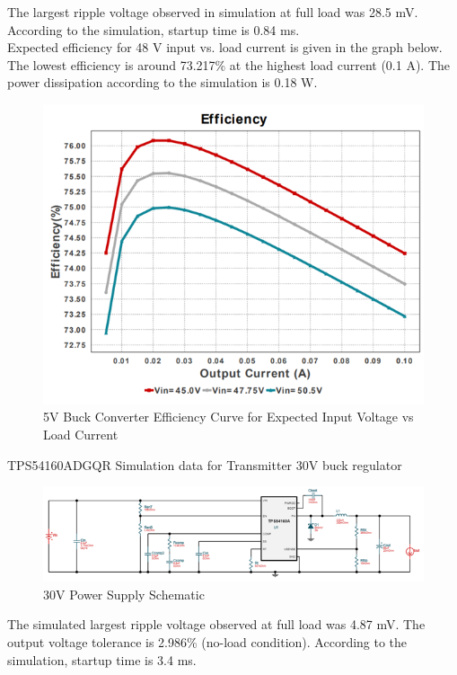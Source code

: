 \documentclass[12pt]{article}
\begin{document}
\noindent
The largest ripple voltage observed in simulation at full load was 28.5 mV.\\

\noindent
According to the simulation, startup time is 0.84 ms.\\

\noindent
Expected efficiency for 48 V input vs. load current is given in the graph below. The lowest efficiency is around 73.217\% at the highest load current (0.1 A). The power dissipation according to the simulation is 0.18 W.

\begin{figure}[h!]
\centering
\includegraphics[width=0.9\linewidth]{5V_eff}
\caption{5V Buck Converter Efficiency Curve for Expected Input Voltage vs Load Current}
\end{figure}

\noindent
TPS54160ADGQR  Simulation data for Transmitter 30V buck regulator

\begin{figure}[h!]
\centering
\includegraphics[width=0.9\linewidth]{48V_schem}
\caption{30V Power Supply Schematic}
\end{figure}

\noindent
The simulated largest ripple voltage observed at full load was 4.87 mV. The output voltage tolerance is 2.986\% (no-load condition). According to the simulation, startup time is 3.4 ms.\\
\end{document}
